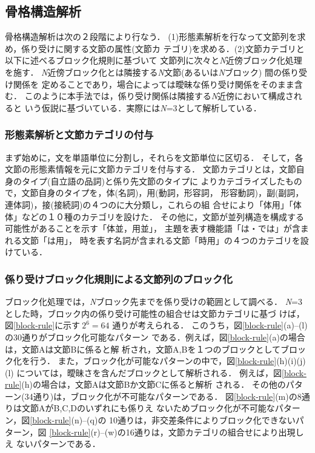 \subsection{骨格構造解析}
骨格構造解析は次の２段階により行なう．
(1)形態素解析を行なって文節列を求め，係り受けに関する文節の属性(文節カ
テゴリ)を求める．(2)文節カテゴリと以下に述べるブロック化規則に基づいて
文節列に次々と{\it N}近傍ブロック化処理を施す．
{\it N}近傍ブロック化とは隣接する{\it N}文節(あるいは{\it N}ブロック)
間の係り受け関係を
定めることであり，場合によっては曖昧な係り受け関係をそのまま含む．
このように本手法では，係り受け関係は隣接する{\it N}近傍において構成されると
いう仮説に基づいている．実際には{\it N}=3として解析している．

\subsubsection{形態素解析と文節カテゴリの付与}
まず始めに，文を単語単位に分割し，それらを文節単位に区切る．
そして，各文節の形態素情報を元に文節カテゴリを付与する．
文節カテゴリとは，文節自身のタイプ(自立語の品詞)と係り先文節のタイプに
よりカテゴライズしたもので，文節自身のタイプを，体(名詞)，用(動詞，形容詞，
形容動詞)，副(副詞，連体詞)，接(接続詞)の４つのに大分類し，これらの組
合せにより「体用」「体体」などの１０種のカテゴリを設けた．
その他に，文節が並列構造を構成する可能性があることを示す「体並，用並」，
主題を表す機能語「は・では」が含まれる文節「は用」，
時を表す名詞が含まれる文節「時用」の４つのカテゴリを設けている．

\subsubsection{係り受けブロック化規則による文節列のブロック化}
ブロック化処理では，{\it N}ブロック先までを係り受けの範囲として調べる．
{\it N}=3とした時，ブロック内の係り受け可能性の組合せは文節カテゴリに基づ
けば，図\ref{block-rule}に示す$\ 2^{6}=64 $ 通りが考えられる．
このうち，図\ref{block-rule}(a)--(l)の30通りがブロック化可能なパターン
である．例えば，図\ref{block-rule}(a)の場合は，文節Aは文節Bに係ると解
析され，文節A,Bを１つのブロックとしてブロック化を行う．
また，ブロック化が可能なパターンの中で，図\ref{block-rule}(h)(i)(j)(l)
については，曖昧さを含んだブロックとして解析される．
例えば，図\ref{block-rule}(h)の場合は，文節Aは文節Bか文節Cに係ると解析
される．
その他のパターン(34通り)は，ブロック化が不可能なパターンである．
図\ref{block-rule}(m)の8通りは文節AがB,C,Dのいずれにも係りえ
ないためブロック化が不可能なパターン，図\ref{block-rule}(n)--(q)の
10通りは，非交差条件によりブロック化できないパターン，図
\ref{block-rule}(r)--(w)の16通りは，文節カテゴリの組合せにより出現しえ
ないパターンである．

